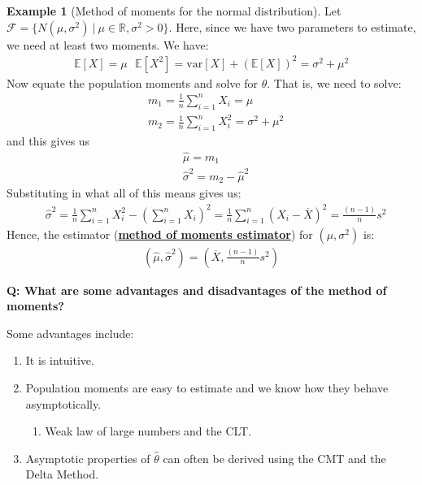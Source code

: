 \documentclass[11pt]{scrartcl}
\newcommand{\R}[0]{\mathbb{R}}
\theoremstyle{definition}
\newtheorem{ex}{Example}
\theoremstyle{remark}
\newcommand{\dfn}[1]{\textbf{\underline{#1}}}
\newcommand{\dist}[0]{\mathcal{F}}
\newcommand{\EX}[1]{\mathbb{E}\left[#1 \right]}
\begin{document}
	\begin{ex}[Method of moments for the normal distribution] Let $\dist = \{ N(\mu, \sigma^2)\ |\ \mu \in \R, \sigma^2 > 0 \}$. Here, since we have two parameters to estimate, we need at least two moments. We have: 
	\begin{align*}
		\EX{X} = \mu \text{ 		} \EX{X^2} = \text{var}[X] + (\EX{X})^2	= \sigma^2 + \mu^2 
	\end{align*}
	Now equate the population moments and solve for $\theta$. That is, we need to solve: 
	\begin{align*}
		& m_1 = \frac{1}{n} \sum_{i=1}^n X_i = \mu \\
		& m_2 = \frac{1}{n} \sum_{i=1}^n X_i^2 = \sigma^2 + \mu^2 	
	\end{align*}
	and this gives us
	\begin{align*}
		& \hat{\mu} = m_1 \\
		& \hat{\sigma}^2 = m_2 - \hat{\mu}^2		
	\end{align*}
	Substituting in what all of this means gives us: 
	\begin{align*}
		& \hat{\sigma}^2 = \frac{1}{n}	\sum_{i=1}^n X_i^2 - \left( 	\sum_{i=1}^n X_i \right)^2 = \frac{1}{n} \sum_{i=1}^n (X_i - \overline{X})^2 = \frac{(n-1)}{n} s^2  
	\end{align*}
	Hence, the estimator (\dfn{method of moments estimator}) for $(\mu, \sigma^2)$ is: 
	\begin{align*}
		(\hat{\mu}, \hat{\sigma}^2) = \left( \overline{X}, \frac{(n-1)}{n} s^2 \right) 	
	\end{align*}
	\end{ex}
	
\textbf{Q: What are some advantages and disadvantages of the method of moments?}
	
Some advantages include: 
	\begin{enumerate}[noitemsep]
		\item It is intuitive. 
		\item Population moments are easy to estimate and we know how they behave asymptotically. 
		\begin{enumerate}[noitemsep]
			\item Weak law of large numbers and the CLT. 
		\end{enumerate}
		\item Asymptotic properties of $\hat{\theta}$ can often be derived using the CMT and the Delta Method. 
	\end{enumerate}
	
\end{document}
